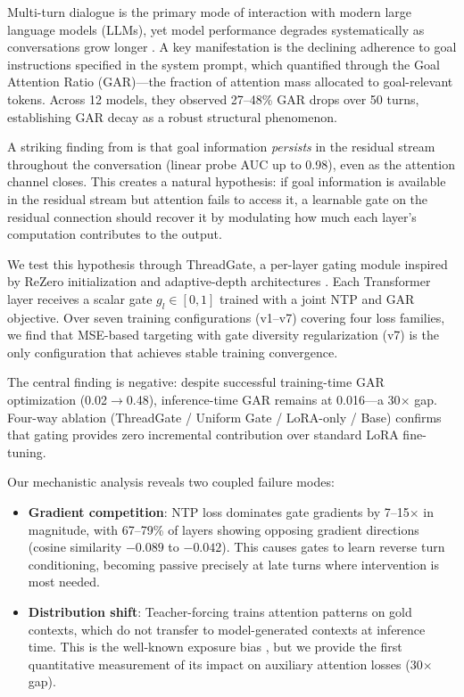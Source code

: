\documentclass[11pt]{article}
\begin{document}
Multi-turn dialogue is the primary mode of interaction with modern large language models (LLMs), yet model performance degrades systematically as conversations grow longer \cite{liu2024lost,xiao2024efficient,ko2024found}.
A key manifestation is the declining adherence to goal instructions specified in the system prompt, which \citet{dongre2026multi} quantified through the Goal Attention Ratio (GAR)---the fraction of attention mass allocated to goal-relevant tokens.
Across 12 models, they observed 27--48\% GAR drops over 50 turns, establishing GAR decay as a robust structural phenomenon.

A striking finding from \citet{dongre2026multi} is that goal information \emph{persists} in the residual stream throughout the conversation (linear probe AUC up to 0.98), even as the attention channel closes.
This creates a natural hypothesis: if goal information is available in the residual stream but attention fails to access it, a learnable gate on the residual connection should recover it by modulating how much each layer's computation contributes to the output.

We test this hypothesis through ThreadGate, a per-layer gating module inspired by ReZero initialization \cite{bachlechner2021rezero} and adaptive-depth architectures \cite{raposo2024mixture,luo2025flexidepth}.
Each Transformer layer receives a scalar gate $g_l \in [0,1]$ trained with a joint NTP and GAR objective.
Over seven training configurations (v1--v7) covering four loss families, we find that MSE-based targeting with gate diversity regularization (v7) is the only configuration that achieves stable training convergence.

The central finding is negative: despite successful training-time GAR optimization (0.02$\to$0.48), inference-time GAR remains at 0.016---a 30$\times$ gap.
Four-way ablation (ThreadGate / Uniform Gate / LoRA-only / Base) confirms that gating provides zero incremental contribution over standard LoRA fine-tuning.

Our mechanistic analysis reveals two coupled failure modes:
\begin{itemize}
\item \textbf{Gradient competition}: NTP loss dominates gate gradients by 7--15$\times$ in magnitude, with 67--79\% of layers showing opposing gradient directions (cosine similarity $-0.089$ to $-0.042$). This causes gates to learn reverse turn conditioning, becoming passive precisely at late turns where intervention is most needed.
\item \textbf{Distribution shift}: Teacher-forcing trains attention patterns on gold contexts, which do not transfer to model-generated contexts at inference time. This is the well-known exposure bias \cite{bengio2015scheduled,ranzato2016sequence}, but we provide the first quantitative measurement of its impact on auxiliary attention losses (30$\times$ gap).
\end{itemize}
\end{document}
